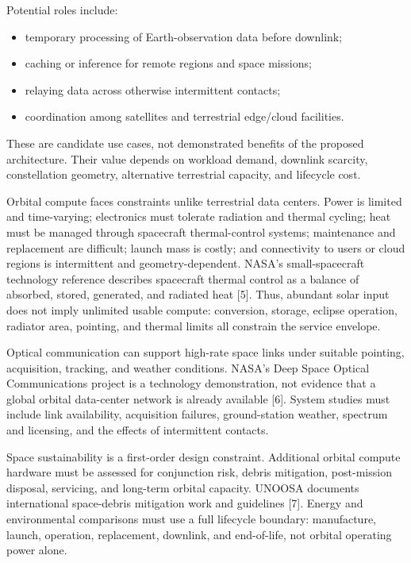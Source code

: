 \documentclass[
  american,
  11pt,
]{article}
\providecommand{\tightlist}{%
  \setlength{\itemsep}{0pt}\setlength{\parskip}{0pt}}
\begin{document}
Potential roles include:

\begin{itemize}
\tightlist
\item
  temporary processing of Earth-observation data before downlink;
\item
  caching or inference for remote regions and space missions;
\item
  relaying data across otherwise intermittent contacts;
\item
  coordination among satellites and terrestrial edge/cloud facilities.
\end{itemize}

These are candidate use cases, not demonstrated benefits of the proposed
architecture. Their value depends on workload demand, downlink scarcity,
constellation geometry, alternative terrestrial capacity, and lifecycle
cost.

Orbital compute faces constraints unlike terrestrial data centers. Power
is limited and time-varying; electronics must tolerate radiation and
thermal cycling; heat must be managed through spacecraft thermal-control
systems; maintenance and replacement are difficult; launch mass is
costly; and connectivity to users or cloud regions is intermittent and
geometry-dependent. NASA's small-spacecraft technology reference
describes spacecraft thermal control as a balance of absorbed, stored,
generated, and radiated heat {[}5{]}. Thus, abundant solar input does
not imply unlimited usable compute: conversion, storage, eclipse
operation, radiator area, pointing, and thermal limits all constrain the
service envelope.

Optical communication can support high-rate space links under suitable
pointing, acquisition, tracking, and weather conditions. NASA's Deep
Space Optical Communications project is a technology demonstration, not
evidence that a global orbital data-center network is already available
{[}6{]}. System studies must include link availability, acquisition
failures, ground-station weather, spectrum and licensing, and the
effects of intermittent contacts.

Space sustainability is a first-order design constraint. Additional
orbital compute hardware must be assessed for conjunction risk, debris
mitigation, post-mission disposal, servicing, and long-term orbital
capacity. UNOOSA documents international space-debris mitigation work
and guidelines {[}7{]}. Energy and environmental comparisons must use a
full lifecycle boundary: manufacture, launch, operation, replacement,
downlink, and end-of-life, not orbital operating power alone.
\end{document}

